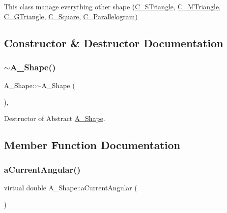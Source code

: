 This class manage everything other shape (\hyperlink{classC__STriangle}{C\+\_\+\+S\+Triangle}, \hyperlink{classC__MTriangle}{C\+\_\+\+M\+Triangle}, \hyperlink{classC__GTriangle}{C\+\_\+\+G\+Triangle}, \hyperlink{classC__Square}{C\+\_\+\+Square}, \hyperlink{classC__Parallelogram}{C\+\_\+\+Parallelogram}) 

\subsection{Constructor \& Destructor Documentation}
\mbox{\label{classA__Shape_ad0a3bcb28f3d4f42043ea8c592bb5f1f}} 
\subsubsection{\texorpdfstring{$\sim$\+A\+\_\+\+Shape()}{~A\_Shape()}}
{\footnotesize\ttfamily A\+\_\+\+Shape\+::$\sim$\+A\+\_\+\+Shape (\begin{DoxyParamCaption}{ }\end{DoxyParamCaption})\hspace{0.3cm}{\ttfamily [pure virtual]}, {\ttfamily [default]}}



Destructor of Abstract \hyperlink{classA__Shape}{A\+\_\+\+Shape}. 



\subsection{Member Function Documentation}
\mbox{\label{classA__Shape_a80fa4e009c875dd0ba7fc5bfeeb43f98}} 
\subsubsection{\texorpdfstring{a\+Current\+Angular()}{aCurrentAngular()}}
{\footnotesize\ttfamily virtual double A\+\_\+\+Shape\+::a\+Current\+Angular (\begin{DoxyParamCaption}{ }\end{DoxyParamCaption})\hspace{0.3cm}{\ttfamily [pure virtual]}}



